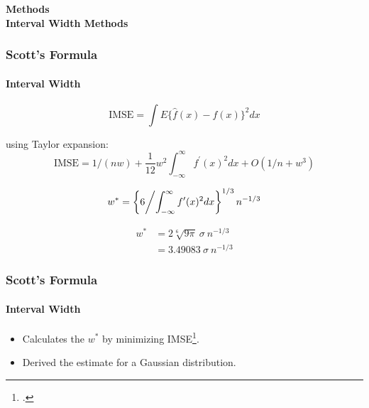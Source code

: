 \documentclass[mathserif]{beamer}
\begin{document}
    \begin{frame}
        \Huge \textbf{Methods} \\
        \qquad \LARGE \textbf{Interval Width Methods}
    \end{frame}


    \begin{frame}
        \frametitle{Scott's Formula}
        \framesubtitle{Interval Width}

        \begin{equation}
            \label{eq:scott_method_imse}
            \textrm{IMSE} = \int E\{\hat{f}(x)-f(x)\}^{2} dx
        \end{equation}

        using Taylor expansion:
        \begin{equation}
            \label{eq:scott_method_imse_taylor}
            \textrm{IMSE} = 1 /\left(n w\right)+\frac{1}{12} w^{2} \int_{-\infty}^{\infty} f^{\prime}(x)^{2} dx +
            O\left(1 /n + w^{3}\right)
        \end{equation}

        \begin{equation}
            \label{eq:scott_method_optimal_width}
            w^{*} = \left\{6 \middle/ \int_{-\infty}^{\infty} f^{\prime}(x)^{2} d x\right\}^{1 / 3}
            n^{-1 / 3}
        \end{equation}

        \begin{equation}
            \label{eq:scott_method_optimal_width_gaussian}
            \begin{split}
                w^{*} & = 2 \sqrt[6]{9 \pi} \: \sigma \: n^{-1 / 3} \\
                & = 3.49083 \: \sigma \: n^{-1 / 3}
            \end{split}
        \end{equation}

    \end{frame}


    \begin{frame}
        \frametitle{Scott's Formula}
        \framesubtitle{Interval Width}

        \begin{itemize}
            \item Calculates the $w^{*}$ by minimizing \textrm{IMSE}\footcite{Scott1979}.
            \item Derived the estimate for a Gaussian distribution.
        \end{itemize}
    \end{frame}
\end{document}
